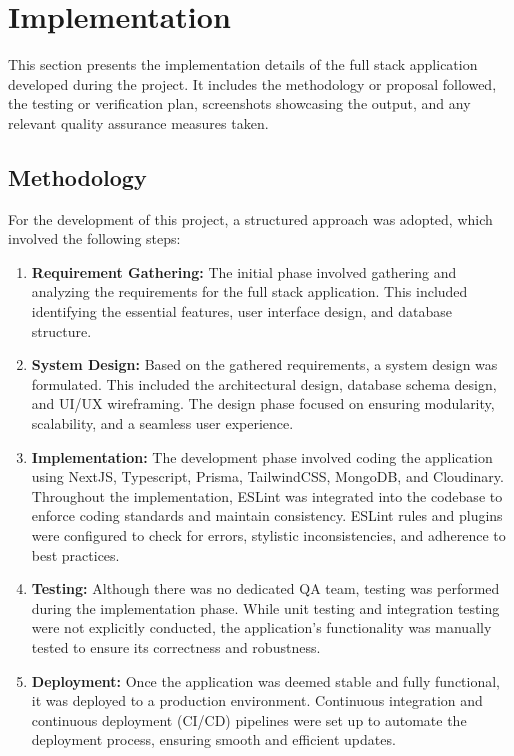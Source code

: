 \chapter{Implementation}
This section presents the implementation details of the full stack application developed during the project. It includes the methodology or proposal followed, the testing or verification plan, screenshots showcasing the output, and any relevant quality assurance measures taken.

\section{Methodology}
For the development of this project, a structured approach was adopted, which involved the following steps:

\begin{enumerate}
	\item \textbf{Requirement Gathering:} The initial phase involved gathering and analyzing the requirements for the full stack application. This included identifying the essential features, user interface design, and database structure.
	\item \textbf{System Design:} Based on the gathered requirements, a system design was formulated. This included the architectural design, database schema design, and UI/UX wireframing. The design phase focused on ensuring modularity, scalability, and a seamless user experience.
	\item \textbf{Implementation:} The development phase involved coding the application using NextJS, Typescript, Prisma, TailwindCSS, MongoDB, and Cloudinary. Throughout the implementation, ESLint was integrated into the codebase to enforce coding standards and maintain consistency. ESLint rules and plugins were configured to check for errors, stylistic inconsistencies, and adherence to best practices.
	\item \textbf{Testing:} Although there was no dedicated QA team, testing was performed during the implementation phase. While unit testing and integration testing were not explicitly conducted, the application's functionality was manually tested to ensure its correctness and robustness.
	\item \textbf{Deployment:} Once the application was deemed stable and fully functional, it was deployed to a production environment. Continuous integration and continuous deployment (CI/CD) pipelines were set up to automate the deployment process, ensuring smooth and efficient updates.
\end{enumerate}

